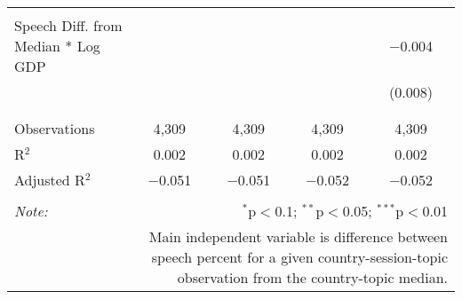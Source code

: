 \begin{table}[!htbp]
\begin{tabular}{@{\extracolsep{5pt}}lcccc}
  & & & & \\ 
 Speech Diff. from Median * Log GDP &  &  &  & $-$0.004 \\ 
  &  &  &  & (0.008) \\ 
  & & & & \\ 
\hline \\[-1.8ex] 
Observations & 4,309 & 4,309 & 4,309 & 4,309 \\ 
R$^{2}$ & 0.002 & 0.002 & 0.002 & 0.002 \\ 
Adjusted R$^{2}$ & $-$0.051 & $-$0.051 & $-$0.052 & $-$0.052 \\ 
\hline 
\hline \\[-1.8ex] 
\textit{Note:}  & \multicolumn{4}{r}{$^{*}$p$<$0.1; $^{**}$p$<$0.05; $^{***}$p$<$0.01} \\ 
 & \multicolumn{4}{r}{Main independent variable is difference between speech percent for a given country-session-topic observation from the country-topic median.} \\ 
\end{tabular} 
\end{table} 
